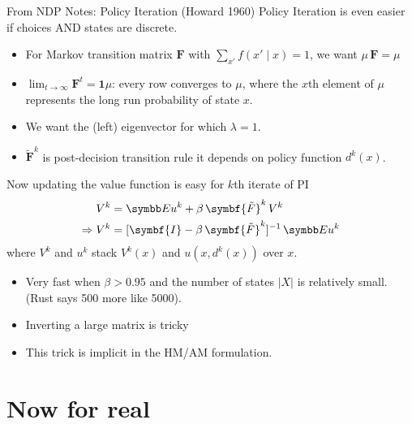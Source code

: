 \documentclass[aspectratio=169,11pt]{beamer}
\begin{document}
\begin{frame}{From NDP Notes:  Policy Iteration (Howard 1960)}
\footnotesize
Policy Iteration is even easier if choices AND states are discrete.
\begin{itemize}
\item For Markov transition matrix $\symbf{F}$ with $\sum_{x'} f(x' \mid x) =1$, we want $\mu \, \symbf{F} = \mu$
\item $\lim_{t \rightarrow \infty} \symbf{F}^t = \symbf{1}\mu$: every row converges to $\mu$, where the $x$th element of $\mu$ represents the long run probability of state $x$.
\item We want the (left) eigenvector for which $\lambda = 1$.
\item $\symbf{\tilde{F}}^k$ is \alert{post-decision transition rule} it depends on \alert{policy function} $d^k(x)$.
\end{itemize}
Now updating the value function is easy for $k$th iterate of PI
\begin{align*}
V^k &= \E u^k + \beta \, \symbf{\tilde{F}}^k \, V^k\\
\Rightarrow V^k &= [\symbf{I} - \beta \, \symbf{\tilde{F}}^k]^{-1}\, \E u^k
\end{align*}
where $V^k$ and $u^k$ stack $V^k(x)$ and $u(x,d^k(x))$ over $x$.
\vspace{-.2cm}
\begin{itemize}
\item Very fast when $\beta > 0.95$ and the number of states $|X|$ is relatively small. (Rust says 500 more like 5000).
\item Inverting a large matrix is tricky
\item \alert{This trick is implicit in the HM/AM formulation}.
\end{itemize}
\end{frame}


\section*{Now for real}
\end{document}
